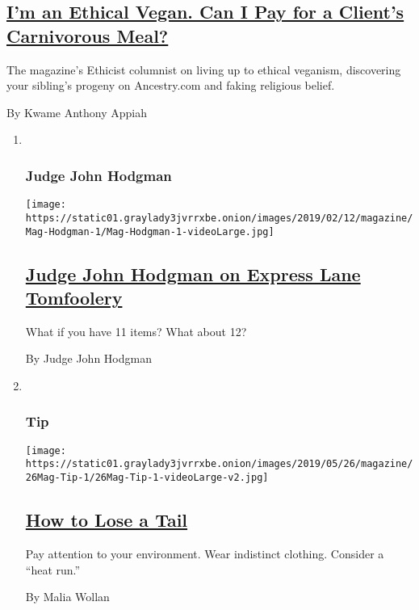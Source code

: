 \begin{enumerate}
{  \subsection{\texorpdfstring{\href{/2019/05/21/magazine/ethical-vegan-dna-test-paternity-ethicist.html}{I'm
  an Ethical Vegan. Can I Pay for a Client's Carnivorous
  Meal?}}{I'm an Ethical Vegan. Can I Pay for a Client's Carnivorous Meal?}}\label{im-an-ethical-vegan-can-i-pay-for-a-clients-carnivorous-meal}}

  The magazine's Ethicist columnist on living up to ethical veganism,
  discovering your sibling's progeny on Ancestry.com and faking
  religious belief.

  By Kwame Anthony Appiah
\end{enumerate}

\begin{enumerate}
\def\labelenumi{\arabic{enumi}.}
\item ~
  \hypertarget{judge-john-hodgman}{%
  \subsubsection{Judge John Hodgman}\label{judge-john-hodgman}}

  \texttt{[image: https://static01.graylady3jvrrxbe.onion/images/2019/02/12/magazine/Mag-Hodgman-1/Mag-Hodgman-1-videoLarge.jpg]}

  \hypertarget{judge-john-hodgman-on-express-lane-tomfoolery}{%
  \subsection{\texorpdfstring{\href{/2019/05/23/magazine/judge-john-hodgman-on-express-lane-tomfoolery.html}{Judge
  John Hodgman on Express Lane
  Tomfoolery}}{Judge John Hodgman on Express Lane Tomfoolery}}\label{judge-john-hodgman-on-express-lane-tomfoolery}}

  What if you have 11 items? What about 12?

  By Judge John Hodgman
\item ~
  \hypertarget{tip}{%
  \subsubsection{Tip}\label{tip}}

  \texttt{[image: https://static01.graylady3jvrrxbe.onion/images/2019/05/26/magazine/26Mag-Tip-1/26Mag-Tip-1-videoLarge-v2.jpg]}

  \hypertarget{how-to-lose-a-tail}{%
  \subsection{\texorpdfstring{\href{/2019/05/21/magazine/how-to-lose-a-tail-tip.html}{How
  to Lose a Tail}}{How to Lose a Tail}}\label{how-to-lose-a-tail}}

  Pay attention to your environment. Wear indistinct clothing. Consider
  a ``heat run.''

  By Malia Wollan
\end{enumerate}


